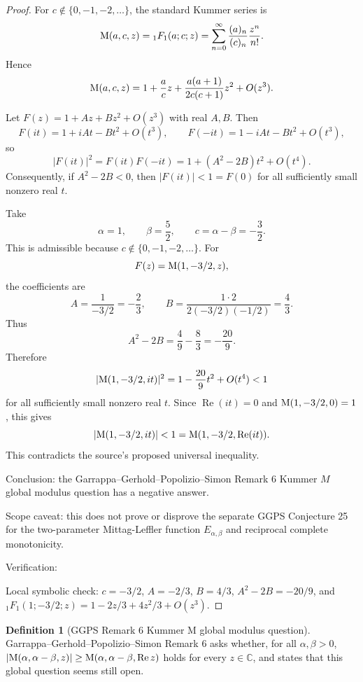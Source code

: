 \documentclass[11pt]{article}
\numberwithin{equation}{section}
\theoremstyle{definition}
\newtheorem{definition}{Definition}[section]
\theoremstyle{remark}
\newcommand{\1}{\mathbf 1}
\begin{document}
\begin{proof}
For \(c\notin\{0,-1,-2,\ldots\}\), the standard Kummer series is
\[
{\rm M}(a,c,z)={}_1F_1(a;c;z)
=\sum_{n=0}^{\infty}\frac{(a)_n}{(c)_n}\frac{z^n}{n!}.
\]
Hence
\[
{\rm M}(a,c,z)
=1+\frac{a}{c}z+\frac{a(a+1)}{2c(c+1)}z^2+O(z^3).
\]

Let \(F(z)=1+Az+Bz^2+O(z^3)\) with real \(A,B\). Then
\[
F(it)=1+iAt-Bt^2+O(t^3),\qquad F(-it)=1-iAt-Bt^2+O(t^3),
\]
so
\[
|F(it)|^2=F(it)F(-it)=1+(A^2-2B)t^2+O(t^4).
\]
Consequently, if \(A^2-2B<0\), then \(|F(it)|<1=F(0)\) for all sufficiently small nonzero real \(t\).

Take
\[
\alpha=1,\qquad \beta=\frac52,\qquad c=\alpha-\beta=-\frac32.
\]
This is admissible because \(c\notin\{0,-1,-2,\ldots\}\). For
\[
F(z)={\rm M}(1,-3/2,z),
\]
the coefficients are
\[
A=\frac{1}{-3/2}=-\frac23,
\qquad
B=\frac{1\cdot2}{2(-3/2)(-1/2)}=\frac43.
\]
Thus
\[
A^2-2B=\frac49-\frac83=-\frac{20}{9}.
\]
Therefore
\[
|{\rm M}(1,-3/2,it)|^2=1-\frac{20}{9}t^2+O(t^4)<1
\]
for all sufficiently small nonzero real \(t\). Since \(\operatorname{Re}(it)=0\) and \({\rm M}(1,-3/2,0)=1\), this gives
\[
|{\rm M}(1,-3/2,it)|<1={\rm M}(1,-3/2,\operatorname{Re}(it)).
\]
This contradicts the source's proposed universal inequality.

Conclusion: the Garrappa--Gerhold--Popolizio--Simon Remark 6 Kummer \(M\) global modulus question has a negative answer.

Scope caveat: this does not prove or disprove the separate GGPS Conjecture 25 for the two-parameter Mittag-Leffler function \(E_{\alpha,\beta}\) and reciprocal complete monotonicity.

Verification:

Local symbolic check: \(c=-3/2\), \(A=-2/3\), \(B=4/3\), \(A^2-2B=-20/9\), and \({}_1F_1(1;-3/2;z)=1-2z/3+4z^2/3+O(z^3)\).
\end{proof}

\begin{definition}[GGPS Remark 6 Kummer M global modulus question]
\label{res:ggps-kummerm-remark6-question}
Garrappa--Gerhold--Popolizio--Simon Remark 6 asks whether, for all \(\alpha,\beta>0\), \(|{\rm M}(\alpha,\alpha-\beta,z)|\ge {\rm M}(\alpha,\alpha-\beta,\operatorname{Re}z)\) holds for every \(z\in\mathbb C\), and states that this global question seems still open.
\end{definition}
\end{document}
